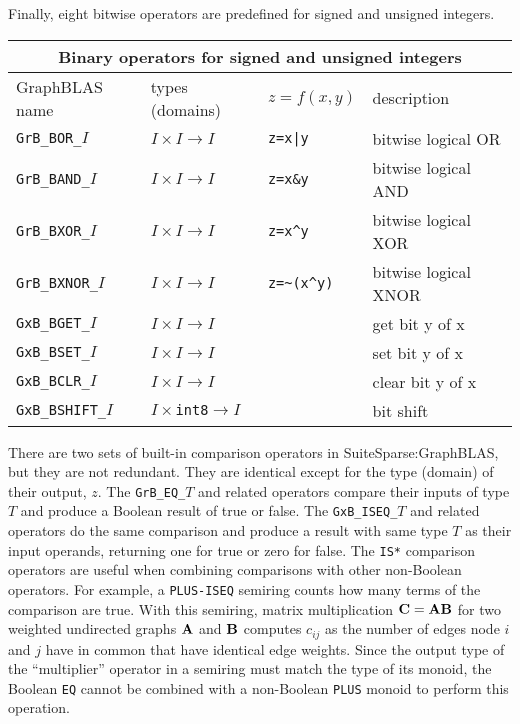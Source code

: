 \documentclass[12pt]{article}
\begin{document}
Finally, eight bitwise operators are predefined for signed and unsigned integers.

\vspace{0.2in}
{\footnotesize
\begin{tabular}{|llll|}
\hline
\multicolumn{4}{|c|}{Binary operators for signed and unsigned integers} \\
\hline
GraphBLAS name        & types (domains)            & $z=f(x,y)$      & description \\
\hline
\verb'GrB_BOR_'$I$    & $I \times I \rightarrow I$ & \verb'z=x|y'    & bitwise logical OR \\
\verb'GrB_BAND_'$I$   & $I \times I \rightarrow I$ & \verb'z=x&y'    & bitwise logical AND \\
\verb'GrB_BXOR_'$I$   & $I \times I \rightarrow I$ & \verb'z=x^y'    & bitwise logical XOR \\
\verb'GrB_BXNOR_'$I$  & $I \times I \rightarrow I$ & \verb'z=~(x^y)' & bitwise logical XNOR \\
\hline
\verb'GxB_BGET_'$I$    & $I \times I \rightarrow I$  & & get bit y of x \\
\verb'GxB_BSET_'$I$    & $I \times I \rightarrow I$  & & set bit y of x \\
\verb'GxB_BCLR_'$I$    & $I \times I \rightarrow I$  & & clear bit y of x \\
\verb'GxB_BSHIFT_'$I$  & $I \times $\verb'int8'$  \rightarrow I$ & & bit shift \\
\hline
\end{tabular}
}
\vspace{0.2in}

There are two sets of built-in comparison operators in SuiteSparse:Graph\-BLAS,
but they are not redundant.  They are identical except for the type (domain) of
their output, $z$.  The \verb'GrB_EQ_'$T$ and related operators compare their
inputs of type $T$ and produce a Boolean result of true or false.  The
\verb'GxB_ISEQ_'$T$ and related operators do the same comparison and produce a
result with same type $T$ as their input operands, returning one for true or
zero for false.  The \verb'IS*' comparison operators are useful when combining
comparisons with other non-Boolean operators.  For example, a \verb'PLUS-ISEQ'
semiring counts how many terms of the comparison are true.  With this semiring,
matrix multiplication ${\bf C=AB}$ for two weighted undirected graphs ${\bf A}$
and ${\bf B}$ computes $c_{ij}$ as the number of edges node $i$ and $j$ have in
common that have identical edge weights.  Since the output type of the
``multiplier'' operator in a semiring must match the type of its monoid, the
Boolean \verb'EQ' cannot be combined with a non-Boolean \verb'PLUS' monoid to
perform this operation.
\end{document}
